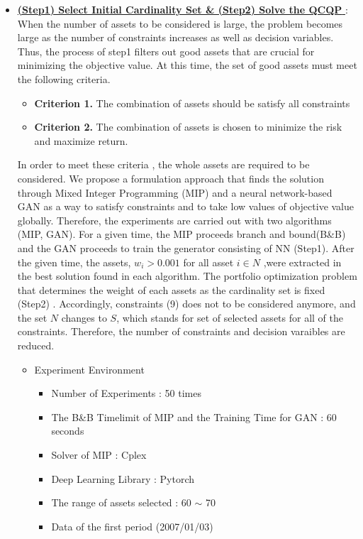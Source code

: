 \documentclass[11pt]{article}
\begin{document}
\begin{itemize}
	\item[]\underline{\textbf{(Step1) Select Initial Cardinality Set \& (Step2) Solve the QCQP }} :
	 When the number of assets to be considered is large, the problem becomes large as the number of constraints increases as well as decision variables. 
	 Thus, the process of step1 filters out good assets that are crucial for minimizing the objective value. At this time, the set of good assets must meet the following criteria.
	 \begin{itemize}
	 	\item[]\textbf{Criterion 1.} The combination of assets should be satisfy all constraints
	 	\item[]\textbf{Criterion 2.} The combination of assets is chosen to minimize the risk and maximize return.
	 \end{itemize}
	  In order to meet these criteria , the whole assets are required to be considered. We propose a formulation approach that finds the solution through Mixed Integer Programming (MIP) and a neural network-based GAN as a way to satisfy constraints and to take low values of objective value globally. Therefore, the experiments are carried out with two algorithms (MIP, GAN). For a given time, the MIP proceeds branch and bound(B\&B) and the GAN proceeds to train the generator consisting of NN (Step1). After the given time, the assets, $w_i> 0.001$ for all asset $i \in N$ ,were extracted in the best solution found in each algorithm. The portfolio optimization problem that determines the weight of each assets as the cardinality set is fixed (Step2) . Accordingly, constraints (9) does not to be considered anymore, and the set $N$ changes to $S$, which stands for set of selected assets for all of the constraints. Therefore, the number of constraints and decision varaibles are reduced. 
	 \begin{itemize}
	 	\item Experiment Environment
	 	\begin{itemize}
	 		\item Number of Experiments : 50 times
	 		\item The B\&B Timelimit of MIP and the Training Time for GAN : 60 seconds
	 		\item Solver of MIP : Cplex
	 		\item Deep Learning Library : Pytorch
	 		\item The range of assets selected : 60 $\sim$ 70  
	 		\item Data of the first period (2007/01/03)

\end{itemize}
\end{itemize}
\end{itemize}
\end{document}
